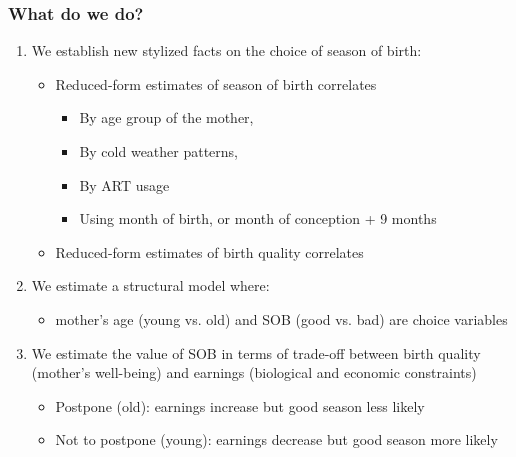 \documentclass[10pt,letterpaper,subeqn]{beamer}
\begin{document}
\begin{frame}[label=map]
\frametitle{What do we do?}

\begin{enumerate}
\item We establish new stylized facts on the choice of season of birth:
\begin{itemize}
\item Reduced-form estimates of season of birth correlates
\begin{itemize}
\item By age group of the mother,
\item By cold weather patterns,
\item By ART usage
\item Using month of birth, or month of conception + 9 months
\end{itemize}
\item Reduced-form estimates of birth quality correlates

\end{itemize}
\item We estimate a structural model where:
      \begin{itemize}
        \item mother's age (young vs. old) and SOB (good vs. bad)  are choice variables
      \end{itemize}
\item We estimate the value of SOB in terms of trade-off between birth quality (mother's well-being) and earnings (biological and economic constraints)
      \begin{itemize}
       \item Postpone (old): earnings increase but good season less likely
       \item Not to postpone (young): earnings decrease but good season more likely
      \end{itemize}
\end{enumerate}
\end{frame}

\end{document}
